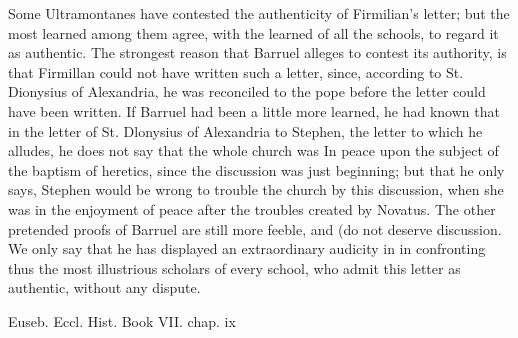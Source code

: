 Some Ultramontanes have contested the authenticity of Firmilian's letter; but the most learned among them agree, with the learned of all the schools, to regard it as authentic. The strongest reason that Barruel alleges to contest its authority, is that Firmillan could not have written such a letter, since, according to St. Dionysius of Alexandria, he was reconciled to the pope before the letter could have been written. If Barruel had been a little more learned, he had known that in the letter of St. Dlonysius of Alexandria to Stephen, the letter to which he alludes, he does not say that the whole church was In peace upon the subject of the baptism of heretics, since the discussion was just beginning; but that he only says, Stephen would be wrong to trouble the church by this discussion, when she was in the enjoyment of peace after the troubles created by Novatus. The other pretended proofs of Barruel are still more feeble, and (do not deserve discussion. We only say that he has displayed an extraordinary audicity in in confronting thus the most illustrious scholars of every school, who admit this letter as authentic, without any dispute.

Euseb. Eccl. Hist. Book VII. chap. ix

